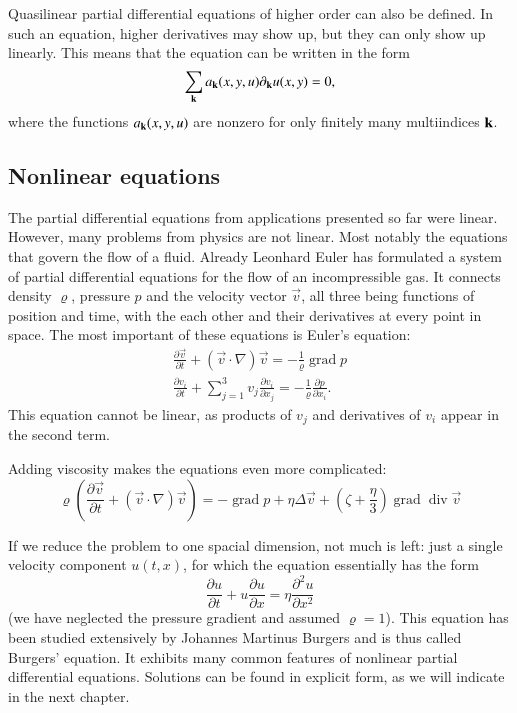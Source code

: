 Quasilinear partial differential equations of higher order can also be
defined.
In such an equation, higher derivatives may show up, but they can only
show up linearly.
This means that the equation can be written in the form
\[
\sum_{\bf k} a_{\bf k}(x,y,u)\partial_{\bf k} u(x,y) = 0,
\]
where the functions $a_{\bf k}(x,y,u)$ are nonzero for only finitely
many multiindices ${\bf k}$.

\subsection{Nonlinear equations
\label{klassifikation:nichtlinear}}
The partial differential equations from applications presented so far
were linear.
However, many problems from physics are not linear.
Most notably the equations that govern the flow of a fluid.
Already Leonhard Euler has formulated a system of partial differential
equations for the flow of an incompressible gas.
It connects density $\varrho$, pressure $p$ and the velocity vector
$\vec{v}$, all three being functions of position and time, with the
each other and their derivatives at every point in space.
The most important of these equations is Euler's equation:
\begin{align*}
\frac{\partial \vec v}{\partial t}
+(\vec v\cdot \nabla)\vec v
=-\frac1{\varrho}\operatorname{grad}p
\\
\frac{\partial v_i}{\partial t}
+\sum_{j=1}^3v_j\frac{\partial v_i}{\partial x_j}
=
-\frac1{\varrho}\frac{\partial p}{\partial x_i}.
\end{align*}
This equation cannot be linear, as products of $v_j$ and derivatives of $v_i$
appear in the second term.

Adding viscosity makes the equations even more complicated:
\[
\varrho\left(
\frac{\partial\vec v}{\partial t}
+
(\vec v\cdot\nabla)\vec v
\right)
=
-\operatorname{grad}p+\eta\Delta \vec v+\left(\zeta+\frac{\eta}3\right)
\operatorname{grad}\operatorname{div}\vec v
\]

If we reduce the problem to one spacial dimension,
not much is left: just a single velocity component
$u(t,x)$, for which the equation essentially has the form
\[
\frac{\partial u}{\partial t}+u\frac{\partial u}{\partial x}
=\eta\frac{\partial^2u}{\partial x^2}
\]
(we have neglected the pressure gradient and assumed $\varrho=1$).
This equation has been studied extensively by Johannes Martinus Burgers
and is thus called Burgers' equation.
It exhibits many common features of nonlinear partial differential equations.
Solutions can be found in explicit form, as we will indicate in the next
chapter.
